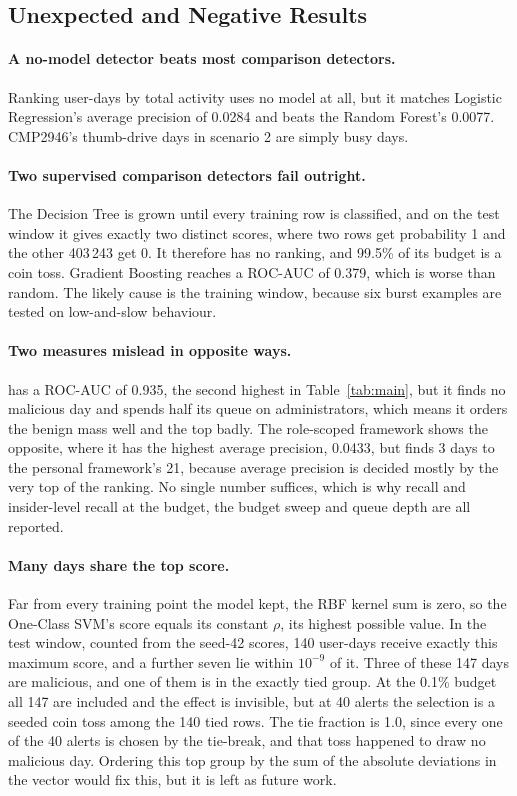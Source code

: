 \documentclass[a4paper,12pt]{article}
\begin{document}
\subsection{Unexpected and Negative Results}
\label{sec:surprises}
\paragraph{A no-model detector beats most comparison detectors.} Ranking user-days by total activity uses no model at all, but it matches Logistic Regression's average precision of 0.0284 and beats the Random Forest's 0.0077. CMP2946's thumb-drive days in scenario 2 are simply busy days.

\paragraph{Two supervised comparison detectors fail outright.} The Decision Tree is grown until every training row is classified, and on the test window it gives exactly two distinct scores, where two rows get probability 1 and the other 403\,243 get 0. It therefore has no ranking, and 99.5\% of its budget is a coin toss. Gradient Boosting reaches a ROC-AUC of 0.379, which is worse than random. The likely cause is the training window, because six burst examples are tested on low-and-slow behaviour.

\paragraph{Two measures mislead in opposite ways.}  has a ROC-AUC of 0.935, the second highest in Table~\ref{tab:main}, but it finds no malicious day and spends half its queue on administrators, which means it orders the benign mass well and the top badly. The role-scoped framework shows the opposite, where it has the highest average precision, 0.0433, but finds 3 days to the personal framework's 21, because average precision is decided mostly by the very top of the ranking. No single number suffices, which is why recall and insider-level recall at the budget, the budget sweep and queue depth are all reported.

\paragraph{Many days share the top score.} Far from every training point the model kept, the RBF kernel sum is zero, so the One-Class SVM's score equals its constant $\rho$, its highest possible value. In the test window, counted from the seed-42 scores, 140 user-days receive exactly this maximum score, and a further seven lie within $10^{-9}$ of it. Three of these 147 days are malicious, and one of them is in the exactly tied group. At the 0.1\% budget all 147 are included and the effect is invisible, but at 40 alerts the selection is a seeded coin toss among the 140 tied rows. The tie fraction is 1.0, since every one of the 40 alerts is chosen by the tie-break, and that toss happened to draw no malicious day. Ordering this top group by the sum of the absolute deviations in the vector would fix this, but it is left as future work.
\end{document}
